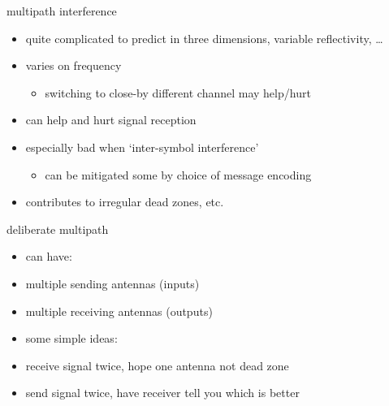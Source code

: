 \begin{frame}{multipath interference}
    \begin{itemize}
    \item quite complicated to predict in three dimensions, variable reflectivity, \ldots
    \item varies on frequency
        \begin{itemize}
        \item switching to close-by different channel may help/hurt
        \end{itemize}
    \item can help and hurt signal reception
    \item especially bad when `inter-symbol interference'
        \begin{itemize}
        \item can be mitigated some by choice of message encoding
        \end{itemize}
    \vspace{.5cm}
    \item contributes to irregular dead zones, etc.
    \end{itemize}
\end{frame}

\begin{frame}{deliberate multipath}
    \begin{itemize}
    \item can have:
    \item multiple sending antennas (inputs)
    \item multiple receiving antennas (outputs)
    \item some simple ideas:
    \vspace{.5cm}
    \item receive signal twice, hope one antenna not dead zone
    \item send signal twice, have receiver tell you which is better
    \end{itemize}
\end{frame}


